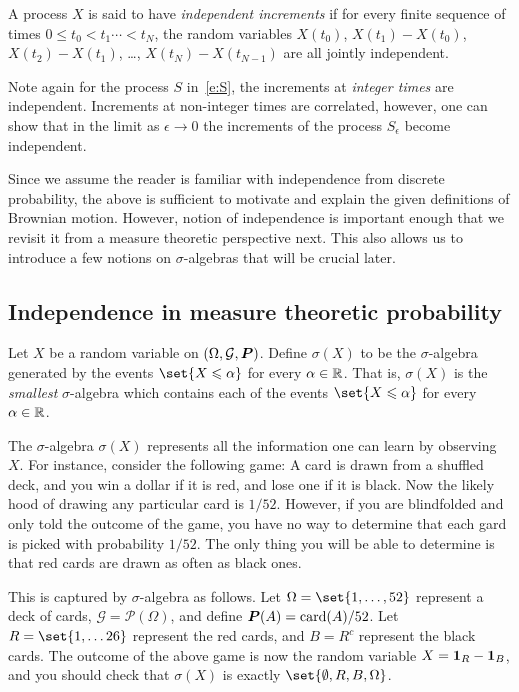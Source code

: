 \begin{definition}
  A process $X$ is said to have \emph{independent increments} if for every finite sequence of times $0 \leq t_0 < t_1 \cdots < t_N$, the random variables $X(t_0)$, $X(t_1) - X(t_0)$, $X(t_2) - X(t_1)$, \dots, $X(t_N) - X(t_{N-1})$ are all jointly independent.
\end{definition}

Note again for the process $S$ in~\eqref{e:S}, the increments at \emph{integer times} are independent.
Increments at non-integer times are correlated, however, one can show that in the limit as $\epsilon \to 0$ the increments of the process $S_\epsilon$ become independent.

Since we assume the reader is familiar with independence from discrete probability, the above is sufficient to motivate and explain the given definitions of Brownian motion.
However, notion of independence is important enough that we revisit it from a measure theoretic perspective next.
This also allows us to introduce a few notions on $\sigma$-algebras that will be crucial later.

\subsection{Independence in measure theoretic probability}


\begin{definition}
  Let $X$ be a random variable on $(\Omega, \mathcal G, \P)$.
  Define $\sigma(X)$ to be the  $\sigma$-algebra generated by the events $\set{X \leq \alpha}$ for every $\alpha \in \R$.
  That is, $\sigma(X)$ is the \emph{smallest} $\sigma$-algebra which contains each of the events $\set{X \leq \alpha}$ for every $\alpha \in \R$.
\end{definition}

\begin{remark}
  The $\sigma$-algebra $\sigma(X)$ represents all the information one can learn by observing $X$.
  For instance, consider the following game: A card is drawn from a shuffled deck, and you win a dollar if it is red, and lose one if it is black.
  Now the likely hood of drawing any particular card is $1/52$.
  However, if you are blindfolded and only told the outcome of the game, you have no way to determine that each gard is picked with probability $1/52$.
  The only thing you will be able to determine is that red cards are drawn as often as black ones.

  This is captured by $\sigma$-algebra as follows.
  Let $\Omega = \set{1, \dots, 52}$ represent a deck of cards, $\mathcal G = \mathcal P(\Omega)$, and define $\P(A) = \operatorname{card}(A)/52$.
  Let $R = \set{1, \dots 26}$ represent the red cards, and $B = R^c$ represent the black cards.
  The outcome of the above game is now the random variable $X = \one_R - \one_B$, and you should check that $\sigma(X)$ is exactly $\set{ \emptyset, R, B, \Omega}$.
\end{remark}

